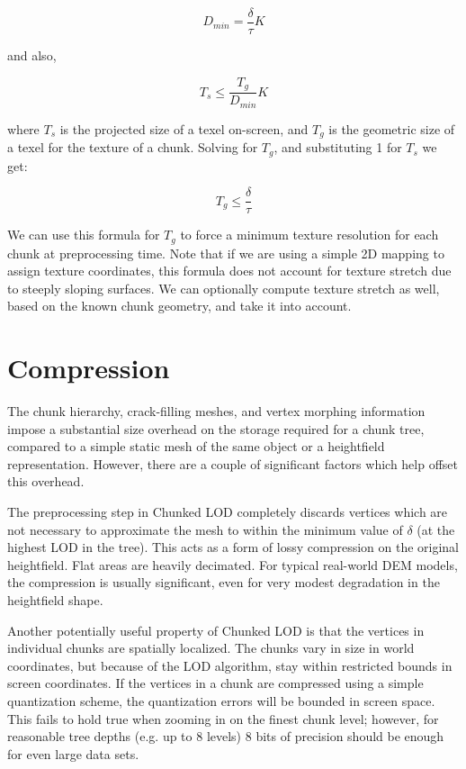 \documentclass[12pt]{article}
\begin{document}
\begin{equation}
D_{min} = \frac{ \delta }{ \tau } K
\end{equation}
 
and also,
 
\begin{equation}
T_s \leq \frac{ T_g }{ D_{min} } K
\end{equation}
 
where $T_s$ is the projected size of a texel on-screen, and $T_g$ is
the geometric size of a texel for the texture of a chunk.  Solving for
$T_g$, and substituting 1 for $T_s$ we get:
 
\begin{equation}
T_g \leq \frac{ \delta }{ \tau }
\end{equation}
 
We can use this formula for $T_g$ to force a minimum texture
resolution for each chunk at preprocessing time.  Note that if we are
using a simple 2D mapping to assign texture coordinates, this formula
does not account for texture stretch due to steeply sloping surfaces.
We can optionally compute texture stretch as well, based on the known
chunk geometry, and take it into account.
 
\section{Compression}

The chunk hierarchy, crack-filling meshes, and vertex morphing
information impose a substantial size overhead on the storage required
for a chunk tree, compared to a simple static mesh of the same object
or a heightfield representation.  However, there are a couple of
significant factors which help offset this overhead.
 
The preprocessing step in Chunked LOD completely discards vertices
which are not necessary to approximate the mesh to within the minimum
value of $\delta$ (at the highest LOD in the tree).  This acts as a form
of lossy compression on the original heightfield.  Flat areas are
heavily decimated.  For typical real-world DEM models, the compression
is usually significant, even for very modest degradation in the
heightfield shape.
 
Another potentially useful property of Chunked LOD is that the
vertices in individual chunks are spatially localized.  The chunks
vary in size in world coordinates, but because of the LOD algorithm,
stay within restricted bounds in screen coordinates.  If the vertices
in a chunk are compressed using a simple quantization scheme, the
quantization errors will be bounded in screen space.  This fails to
hold true when zooming in on the finest chunk level; however, for
reasonable tree depths (e.g. up to 8 levels) 8 bits of precision
should be enough for even large data sets.
 
\end{document}
